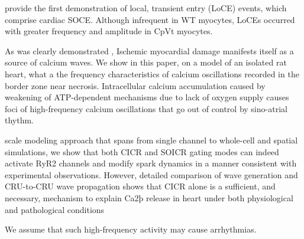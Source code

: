 \documentclass{biophys-new}
\begin{document}
\cite{bonilla2019enhancement} provide the first demonstration of local, transient  entry
(LoCE) events, which comprise cardiac SOCE. Although infrequent in WT myocytes, LoCEs occurred
with greater frequency and amplitude in CpVt myocytes.

As was clearly demonstrated \cite{matsuura2018intravital},
Ischemic myocardial damage manifests itself as a source of calcium waves.
We show in this paper, on a model of an isolated rat heart, what a the frequency characteristics of calcium oscillations recorded in the border zone near necrosis.
Intracellular calcium accumulation caused by weakening of ATP-dependent mechanisms due to lack of oxygen supply causes foci of high-frequency calcium oscillations that go out of control by sino-atrial thythm.

scale modeling approach that spans from single channel to whole-cell and spatial
simulations, we show that both CICR and SOICR gating modes can indeed activate RyR2 channels and modify  spark dynamics in a manner consistent
with experimental observations. However, detailed comparison of  wave
generation and CRU-to-CRU  wave propagation shows that CICR alone
is a sufficient, and necessary, mechanism to explain Ca2þ release in heart under
both physiological and pathological conditions
\cite{williams2017does}

We assume that such high-frequency activity may cause arrhythmias.
\end{document}
